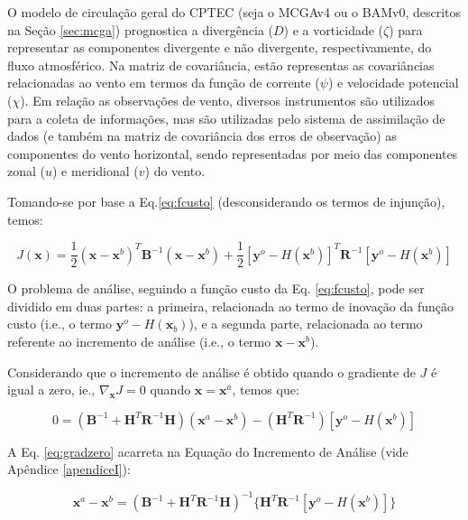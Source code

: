 O modelo de circulação geral do CPTEC (seja o MCGAv4 ou o BAMv0, descritos na Seção \ref{sec:mcga}) prognostica a divergência ($D$) e a vorticidade ($\zeta$) para representar as componentes divergente e não divergente, respectivamente, do fluxo atmosférico. Na matriz de covariância, estão representas as covariâncias relacionadas ao vento em termos da função de corrente ($\psi$) e velocidade potencial ($\chi$). Em relação as observações de vento, diversos instrumentos são utilizados para a coleta de informações, mas são utilizadas pelo sistema de assimilação de dados (e também na matriz de covariância dos erros de observação) as componentes do vento horizontal, sendo representadas por meio das componentes zonal ($u$) e meridional ($v$) do vento.

Tomando-se por base a Eq.\ref{eq:fcusto} (desconsiderando os termos de injunção), temos:

\begin{equation}
    J(\mathbf{x}) = \frac{1}{2} (\mathbf{x} - \mathbf{x}^{b})^{T} \mathbf{B}^{-1} (\mathbf{x} - \mathbf{x}^{b}) + \frac{1}{2} [\mathbf{y}^{o}-\textit{H}(\mathbf{x}^{b})]^{T} \mathbf{R}^{-1} [\mathbf{y}^{o}-\textit{H}(\mathbf{x}^{b})]
\end{equation}

O problema de análise, seguindo a função custo da Eq. \ref{eq:fcusto}, pode ser dividido em duas partes: a primeira, relacionada ao termo de inovação da função custo (i.e., o termo $\mathbf{y}^{o}-\textit{H}(\mathbf{x}_{b})$), e a segunda parte, relacionada ao termo referente ao incremento de análise (i.e., o termo $\mathbf{x} - \mathbf{x}^{b}$).

Considerando que o incremento de análise é obtido quando o gradiente de $J$ é igual a zero, ie., $\nabla_{\mathbf{x}}{J}=0$ quando $\mathbf{x}=\mathbf{x}^{a}$, temos que:

\begin{equation}
    0 =  (\mathbf{B}^{-1} + \mathbf{H}^{T}\mathbf{R}^{-1}\mathbf{H})(\mathbf{x}^{a}-\mathbf{x}^{b}) - (\mathbf{H}^{T}\mathbf{R}^{-1})[\mathbf{y}^{o}-\textit{H}(\mathbf{x}^{b})]
    \label{eq:gradzero}
\end{equation}

A Eq. \ref{eq:gradzero} acarreta na Equação do Incremento de Análise (vide Apêndice \ref{apendiceI}):

\begin{equation}
    \mathbf{x}^{a}-\mathbf{x}^{b} = (\mathbf{B}^{-1} + \mathbf{H}^{T}\mathbf{R}^{-1}\mathbf{H})^{-1} \{\mathbf{H}^{T}\mathbf{R}^{-1} [\mathbf{y}^{o}-\textit{H}(\mathbf{x}^{b})]\}
    \label{eq:incranl}
\end{equation}

